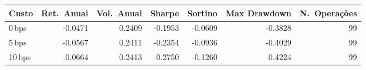 \begin{tabular}{lrrrrrr}
\toprule
Custo & Ret.\ Anual & Vol.\ Anual & Sharpe & Sortino & Max Drawdown & N.\ Opera\c{c}\~oes \\
\midrule
0\,bps & -0.0471 & 0.2409 & -0.1953 & -0.0609 & -0.3828 & 99 \\
5\,bps & -0.0567 & 0.2411 & -0.2354 & -0.0936 & -0.4029 & 99 \\
10\,bps & -0.0664 & 0.2413 & -0.2750 & -0.1260 & -0.4224 & 99 \\
\bottomrule
\end{tabular}